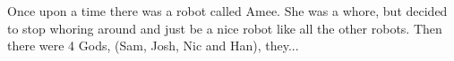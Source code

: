 Once upon a time there was a robot called Amee. She was a whore, but decided to stop whoring around and just be a nice robot like all the other robots. Then there were 4 Gods, (Sam, Josh, Nic and Han), they...
